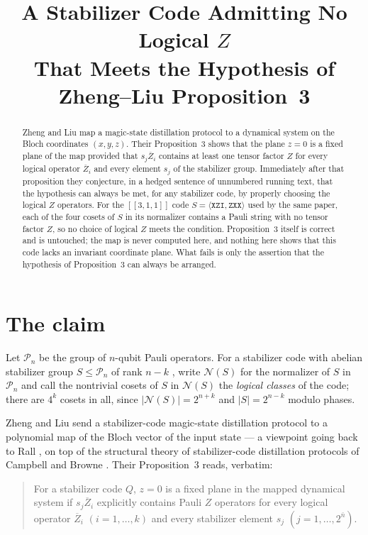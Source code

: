 \documentclass[11pt]{amsart}
\title[Failure of the hypothesis of Zheng--Liu Proposition~3]
{A Stabilizer Code Admitting No Logical $Z$\\That Meets the Hypothesis of Zheng--Liu Proposition~3}
\date{}
\theoremstyle{remark}
\theoremstyle{definition}
\newcommand{\PP}{\mathcal P}
\newcommand{\NN}{\mathcal N}
\newcommand{\Zb}{\overline Z}
\newcommand{\str}[1]{\texttt{#1}}
\begin{document}
\begin{abstract}
Zheng and Liu map a magic-state distillation protocol to a dynamical system on the Bloch
coordinates $(x,y,z)$. Their Proposition~3 shows that the plane $z=0$ is a fixed plane of the map
provided that $s_j\Zb_i$ contains at least one tensor factor $Z$ for every logical operator
$\Zb_i$ and every element $s_j$ of the stabilizer group. Immediately after that proposition they
conjecture, in a hedged sentence of unnumbered running text, that the hypothesis can always be met,
for any stabilizer code, by properly choosing the logical $Z$ operators. For the $[[3,1,1]]$
code $S=\langle \str{XZI},\str{ZXX}\rangle$ used by the same paper, each of the four cosets of $S$
in its normalizer contains a Pauli string with no tensor factor $Z$, so no choice of logical $Z$
meets the condition. Proposition~3 itself is correct and is untouched; the map is never computed
here, and nothing here shows that this code lacks an invariant coordinate plane. What fails is only
the assertion that the hypothesis of Proposition~3 can always be arranged.
\end{abstract}

\maketitle

\section{The claim}\label{sec:claim}

Let $\PP_n$ be the group of $n$-qubit Pauli operators. For a stabilizer code with abelian
stabilizer group $S\le\PP_n$ of rank $n-k$ \cite{G}, write $\NN(S)$ for the normalizer of $S$ in
$\PP_n$ and call the nontrivial cosets of $S$ in $\NN(S)$ the \emph{logical classes} of the code;
there are $4^k$ cosets in all, since $|\NN(S)|=2^{n+k}$ and $|S|=2^{n-k}$ modulo phases.

Zheng and Liu \cite{ZL} send a stabilizer-code magic-state distillation protocol to a polynomial map
of the Bloch vector of the input state --- a viewpoint going back to Rall \cite{R}, on top of the
structural theory of stabilizer-code distillation protocols of Campbell and Browne \cite{CB}. Their
Proposition~3 reads, verbatim:

\begin{quote}
For a stabilizer code $Q$, $z=0$ is a fixed plane in the mapped dynamical system if $s_j\Zb_i$
explicitly contains Pauli $Z$ operators for every logical operator $\Zb_i$ $(i=1,\dots,k)$ and
every stabilizer element $s_j$ $(j=1,\dots,2^{\bar n})$.
\end{quote}
\end{document}
